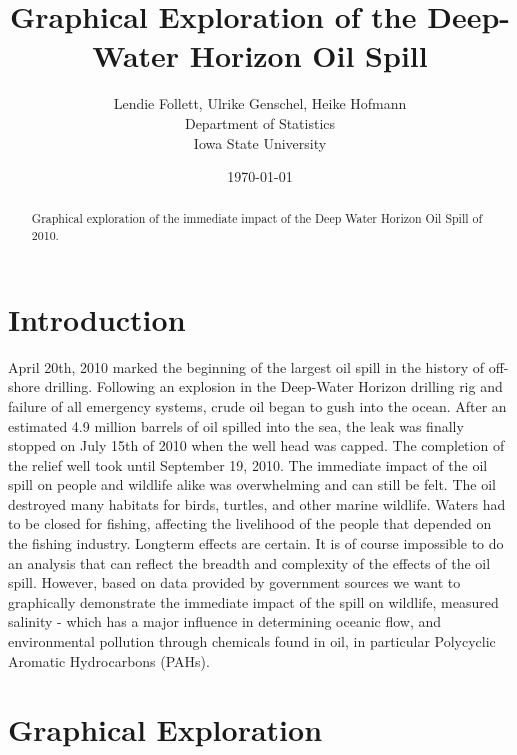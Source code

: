 \documentclass[authoryear,12pt]{elsarticle}
\title{Graphical Exploration of the Deep-Water Horizon Oil Spill}
\author{Lendie Follett, Ulrike Genschel, Heike Hofmann\\Department of Statistics\\Iowa State University}
\date{\today}                                           %
\begin{document}
\maketitle
\begin{abstract}
Graphical exploration of the immediate impact of the Deep Water Horizon Oil Spill of 2010. 
\end{abstract}
\section{Introduction}
April 20th, 2010 marked the beginning of the largest oil spill in the history of off-shore drilling.  Following an explosion in the Deep-Water Horizon drilling rig and failure of all emergency systems, crude oil began to gush into the ocean.  After an estimated 4.9 million barrels of oil spilled into the sea, the leak was finally stopped on July 15th of 2010 when the well head was capped.  The completion of the relief well took until September 19, 2010.  The immediate impact of the oil spill on people and wildlife alike was overwhelming and can still be felt.  The oil destroyed many habitats for birds, turtles, and other marine wildlife.  Waters had to be closed for fishing, affecting the livelihood of the people that depended on the fishing industry. Longterm effects are certain. It is of course impossible to do an analysis that can reflect the breadth and complexity of the effects of the oil spill.  However, based on data provided by government sources we want to graphically demonstrate the immediate impact of the spill on wildlife, measured salinity - which has a major influence in determining oceanic flow, and environmental pollution through chemicals found in oil, in particular Polycyclic Aromatic Hydrocarbons (PAHs). 


%
\section{Graphical Exploration}
\end{document}

